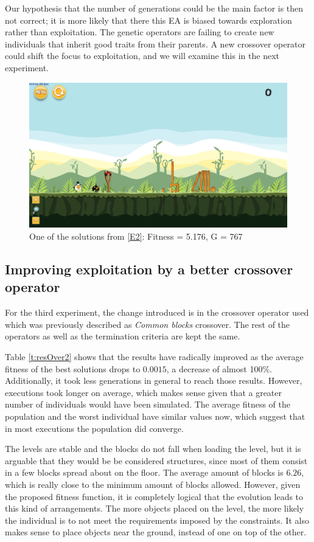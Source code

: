 \documentclass[sigconf]{acmart}
\begin{document}
Our hypothesis that the number of generations could be the main factor
is then not correct; it is more likely that there this EA is biased towards 
exploration rather than exploitation. The genetic operators are failing to 
create new individuals that inherit good traits from their parents. A new 
crossover operator could shift the focus to exploitation, and we will
examine this in the next experiment.
\begin{figure}
	\centering
	\includegraphics[scale=0.2]{level-0-base_large180529_223045.png}
	\caption{One of the solutions from \ref{E2}: Fitness = 5.176, G = 767  }\label{f:e2-4}
\end{figure}
\subsection{Improving exploitation by a better crossover operator}\label{E3}

For the third experiment, the change introduced is in the crossover operator 
used which was previously described as \textit{Common blocks} crossover. 
The rest of the operators as 
well as the termination criteria are kept the same. 

Table \ref{t:resOver2} shows that the results have radically improved as the 
average fitness of the best solutions drops to $0.0015$, a decrease of almost 
100\%. Additionally, it took less generations in general to reach those 
results. However, executions took longer on average, which makes sense given 
that a greater number of individuals would have been simulated. The average 
fitness of the population and the worst individual have similar values now, 
which suggest that in most executions the population did converge.

The levels are stable and the blocks do not fall when loading the level, but 
it is arguable that they would be be considered structures, since most of them consist in a 
few blocks spread about on the floor. The average amount of blocks is $6.26$, 
which is really close to the minimum amount of blocks allowed. However, given 
the proposed fitness function, it is completely logical that the evolution 
leads to this kind of arrangements. The more objects placed on the level, the 
more likely the individual is to not meet the requirements imposed by the 
constraints. It also makes sense to place objects near the ground, instead of 
one on top of the other.
\end{document}
